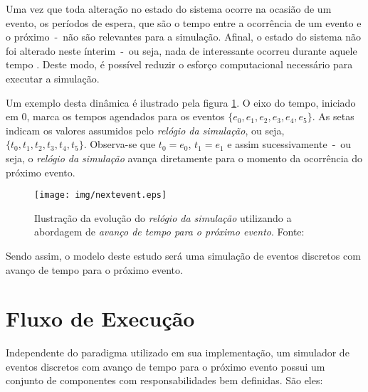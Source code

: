 Uma vez que toda alteração no estado do sistema ocorre na ocasião de um evento,
os períodos de espera, que são o tempo entre a ocorrência de um evento e o
próximo~-~não são relevantes para a simulação. Afinal, o estado do sistema não
foi alterado neste ínterim~-~ou seja, nada de interessante ocorreu durante
aquele tempo \cite{Sim}. Deste modo, é possível reduzir o esforço computacional
necessário para executar a simulação.

Um exemplo desta dinâmica é ilustrado pela figura \ref{fig:nextevent}. O eixo do
tempo, iniciado em 0, marca os tempos agendados para os eventos $\{e_{0}, e_{1},
e_{2}, e_{3}, e_{4}, e_{5}\}$. As setas indicam os valores assumidos pelo
\textit{relógio da simulação}, ou seja, $\{t_{0}, t_{1}, t_{2}, t_{3}, t_{4},
t_{5}\}$. Observa-se que $t_{0} = e_{0}$, $t_{1} = e_{1}$ e assim
sucessivamente~-~ou seja, o \textit{relógio da simulação} avança diretamente
para o momento da ocorrência do próximo evento.

\begin{figure}[htb!]
\centering\texttt{[image: img/nextevent.eps]}
\caption[Avanço de tempo para o próximo evento.]{\label{fig:nextevent}Ilustração da evolução do \textit{relógio da simulação} utilizando a abordagem de \textit{avanço de tempo para o próximo evento}. Fonte:~\cite{Law}}
\end{figure}

Sendo assim, o modelo deste estudo será uma simulação de eventos discretos com avanço de tempo para o próximo evento.

\section{\label{simulator:flow}Fluxo de Execução}

Independente do paradigma utilizado em sua implementação, um simulador de
eventos discretos com avanço de tempo para o próximo evento possui um conjunto
de componentes com responsabilidades bem definidas. São eles:

